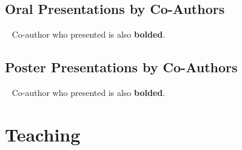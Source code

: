 \documentclass[%
]{komacv}
\begin{document}
\subsection{Oral Presentations by Co-Authors}
~
{\small Co-author who presented is also \textbf{bolded}.}

\begin{refcontext}[]
\nocite{*}
\printbibliography[keyword=talk-coauthor, heading=none, resetnumbers=true]
\end{refcontext}

\subsection{Poster Presentations by Co-Authors}
~
{\small Co-author who presented is also \textbf{bolded}.}

\begin{refcontext}[]
\nocite{*}
\printbibliography[keyword=poster-coauthor, heading=none, resetnumbers=true]
\end{refcontext}

\section{Teaching}
\end{document}
